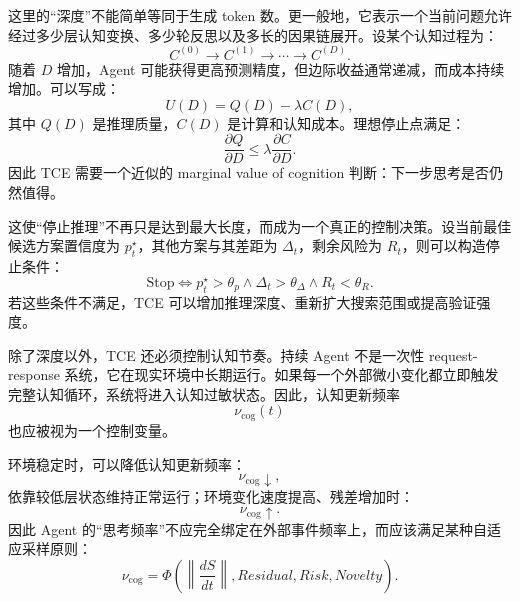 这里的“深度”不能简单等同于生成 token 数。更一般地，它表示一个当前问题允许经过多少层认知变换、多少轮反思以及多长的因果链展开。设某个认知过程为：
\begin{equation}
    C^{(0)}
    \rightarrow
    C^{(1)}
    \rightarrow
    \cdots
    \rightarrow
    C^{(D)}.
\end{equation}
随着 $D$ 增加，Agent 可能获得更高预测精度，但边际收益通常递减，而成本持续增加。可以写成：
\begin{equation}
    U(D)
    =
    Q(D)
    -
    \lambda C(D),
\end{equation}
其中 $Q(D)$ 是推理质量，$C(D)$ 是计算和认知成本。理想停止点满足：
\begin{equation}
    \frac{\partial Q}{\partial D}
    \le
    \lambda
    \frac{\partial C}{\partial D}.
\end{equation}
因此 TCE 需要一个近似的 marginal value of cognition 判断：下一步思考是否仍然值得。

这使“停止推理”不再只是达到最大长度，而成为一个真正的控制决策。设当前最佳候选方案置信度为 $p^\star_t$，其他方案与其差距为 $\Delta_t$，剩余风险为 $R_t$，则可以构造停止条件：
\begin{equation}
    \mathrm{Stop}
    \iff
    p^\star_t>\theta_p
    \land
    \Delta_t>\theta_\Delta
    \land
    R_t<\theta_R.
\end{equation}
若这些条件不满足，TCE 可以增加推理深度、重新扩大搜索范围或提高验证强度。

除了深度以外，TCE 还必须控制认知节奏。持续 Agent 不是一次性 request-response 系统，它在现实环境中长期运行。如果每一个外部微小变化都立即触发完整认知循环，系统将进入认知过敏状态。因此，认知更新频率
\begin{equation}
    \nu_{\mathrm{cog}}(t)
\end{equation}
也应被视为一个控制变量。

环境稳定时，可以降低认知更新频率：
\begin{equation}
    \nu_{\mathrm{cog}}\downarrow,
\end{equation}
依靠较低层状态维持正常运行；环境变化速度提高、残差增加时：
\begin{equation}
    \nu_{\mathrm{cog}}\uparrow.
\end{equation}
因此 Agent 的“思考频率”不应完全绑定在外部事件频率上，而应该满足某种自适应采样原则：
\begin{equation}
    \nu_{\mathrm{cog}}
    =
    \Phi
    \left(
    \left\|
    \frac{dS}{dt}
    \right\|,
    Residual,
    Risk,
    Novelty
    \right).
\end{equation}

